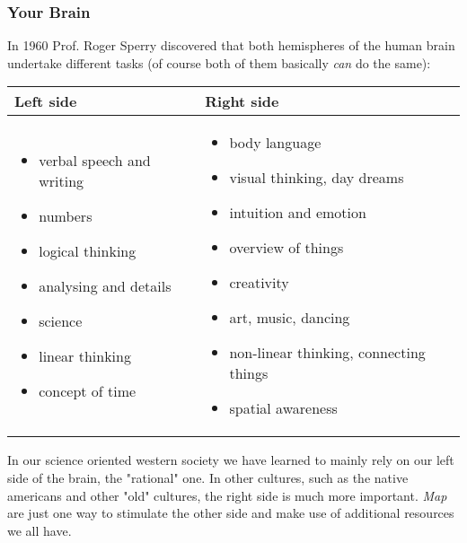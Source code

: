\documentclass[12pt,a4paper]{article}
\begin{document}
\subsubsection*{Your Brain}
In 1960 Prof. {\sc Roger Sperry} discovered that both hemispheres
of the human brain undertake different tasks (of course both of them
basically {\em can} do the same): 
\begin{center}
\begin{tabular}{|p{5.5cm}|p{5.5cm}|} \hline
    Left side & Right side \\ \hline
    \begin{itemize}
       \item verbal speech and writing 
       \item numbers
       \item logical thinking
       \item analysing and details
       \item science
       \item linear thinking
       \item concept of time
    \end{itemize} &
    \begin{itemize}
        \item body language
        \item visual thinking, day dreams
        \item intuition and emotion
        \item overview of things
        \item creativity
        \item art, music, dancing
        \item non-linear thinking, connecting things
        \item spatial awareness
    \end{itemize}     \\ \hline
\end{tabular}   
\end{center}
In our science oriented western society we have learned to mainly rely
on our left side of the brain, the "rational" one. In other cultures,
such as the native americans and other "old" cultures, the right side is
much more important. {\em Map} are just one way to stimulate the other
side and make use of additional resources we all have.
\end{document}
